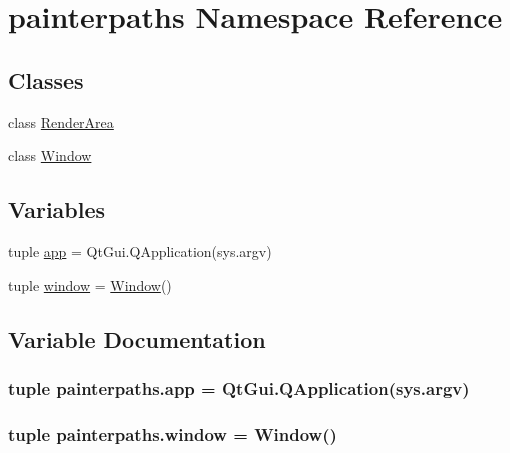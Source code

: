 \hypertarget{namespacepainterpaths}{}\section{painterpaths Namespace Reference}
\label{namespacepainterpaths}
\subsection*{Classes}
\begin{DoxyCompactItemize}
\item 
class \hyperlink{classpainterpaths_1_1RenderArea}{Render\+Area}
\item 
class \hyperlink{classpainterpaths_1_1Window}{Window}
\end{DoxyCompactItemize}
\subsection*{Variables}
\begin{DoxyCompactItemize}
\item 
tuple \hyperlink{namespacepainterpaths_a8f6364534acfdbe26e3bcd0385dd8587}{app} = Qt\+Gui.\+Q\+Application(sys.\+argv)
\item 
tuple \hyperlink{namespacepainterpaths_add6f645c6ed494c2acebbaa063e30f11}{window} = \hyperlink{classpainterpaths_1_1Window}{Window}()
\end{DoxyCompactItemize}


\subsection{Variable Documentation}
\hypertarget{namespacepainterpaths_a8f6364534acfdbe26e3bcd0385dd8587}{}
\subsubsection[{app}]{\setlength{\rightskip}{0pt plus 5cm}tuple painterpaths.\+app = Qt\+Gui.\+Q\+Application(sys.\+argv)}\label{namespacepainterpaths_a8f6364534acfdbe26e3bcd0385dd8587}
\hypertarget{namespacepainterpaths_add6f645c6ed494c2acebbaa063e30f11}{}
\subsubsection[{window}]{\setlength{\rightskip}{0pt plus 5cm}tuple painterpaths.\+window = {\bf Window}()}\label{namespacepainterpaths_add6f645c6ed494c2acebbaa063e30f11}
